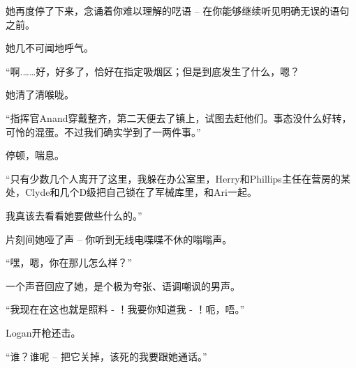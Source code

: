 \begin{scpbox}

她再度停了下来，念诵着你难以理解的呓语 – 在你能够继续听见明确无误的语句之前。

她几不可闻地呼气。

\end{scpbox}

\begin{scpdialog}
“啊.……好，好多了，恰好在指定吸烟区；但是到底发生了什么，嗯？
\end{scpdialog}

\begin{scpbox}
她清了清喉咙。
\end{scpbox}

\begin{scpdialog}
“指挥官Anand穿戴整齐，第二天便去了镇上，试图去赶他们。事态没什么好转，可怜的混蛋。不过我们确实学到了一两件事。”
\end{scpdialog}

\begin{scpbox}
停顿，喘息。
\end{scpbox}

\begin{scpdialog}

“只有少数几个人离开了这里，我躲在办公室里，Herry和Phillips主任在营房的某处，Clyde和几个D级把自己锁在了军械库里，和Ari一起。

我真该去看看她要做些什么的。”

\end{scpdialog}

\begin{scpbox}
片刻间她哑了声 – 你听到无线电喋喋不休的嗡嗡声。
\end{scpbox}

\begin{scpdialog}
“嘿，嗯，你在那儿怎么样？”
\end{scpdialog}

\begin{scpbox}
一个声音回应了她，是个极为夸张、语调嘲讽的男声。
\end{scpbox}

\begin{scpdialog}
“我现在在这也就是照料 - ！我要你知道我 - ！呃，唔。”
\end{scpdialog}

\begin{scpbox}
Logan开枪还击。
\end{scpbox}

\begin{scpdialog}
“谁？谁呢 – 把它关掉，该死的我要跟她通话。”
\end{scpdialog}

